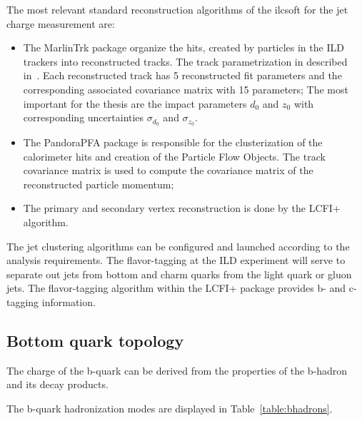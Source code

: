 The most relevant standard reconstruction algorithms of the {\sc ilcsoft} for the jet charge measurement are:
\begin{itemize}
\item The MarlinTrk package organize the hits, created by particles in the ILD trackers into reconstructed tracks. The track parametrization in described in~\cite{bib:LCIOtrack}. Each reconstructed track has 5 reconstructed fit parameters and the corresponding associated covariance matrix with 15 parameters; The most important for the thesis are the impact parameters $d_0$ and $z_0$ with corresponding uncertainties $\sigma_{d_0}$ and $\sigma_{z_0}$.
\item The PandoraPFA package is responsible for the clusterization of the calorimeter hits and creation of the Particle Flow Objects. The track covariance matrix is used to compute the covariance matrix of the reconstructed particle momentum; 
\item The primary and secondary vertex reconstruction is done by the LCFI+ algorithm. 
\end{itemize}
The jet clustering algorithms can be configured and launched according to the analysis requirements. 
The flavor-tagging at the ILD experiment will serve to separate out jets from bottom and charm quarks from the light quark or gluon jets.
The flavor-tagging algorithm within the LCFI+ package provides  b- and c-tagging information.


\subsection{Bottom quark topology}

The charge of the b-quark can be derived from the properties of the b-hadron and its decay products. 


The b-quark hadronization modes are displayed in Table~\ref{table:bhadrons}.


